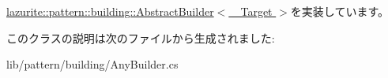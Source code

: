 \hyperlink{classlazurite_1_1pattern_1_1building_1_1_abstract_builder_3_01___target_01_4_a4ddf3d66757e93e0a410708fff784801}{lazurite::pattern::building::AbstractBuilder$<$ \_\-Target $>$}を実装しています。

このクラスの説明は次のファイルから生成されました:\begin{DoxyCompactItemize}
\item 
lib/pattern/building/AnyBuilder.cs\end{DoxyCompactItemize}
